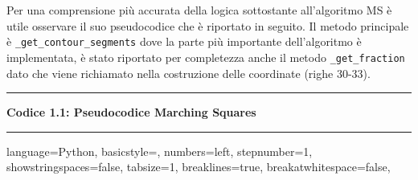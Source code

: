 \documentclass[12pt,a4paper]{report}
\begin{document}
Per una comprensione più accurata della logica sottostante all'algoritmo MS è utile osservare il suo pseudocodice che è riportato in seguito. \newline
Il metodo principale è \verb|_get_contour_segments| dove la parte più importante dell'algoritmo è implementata, è stato riportato per completezza anche il metodo \verb|_get_fraction| dato che viene richiamato nella costruzione delle coordinate (righe 30-33). 
\\[10pt]
\noindent\rule[0.5ex]{\linewidth}{2pt}
\small{\textbf{Codice 1.1: Pseudocodice Marching Squares}} \\
\noindent\rule[0.5ex]{\linewidth}{1pt}
\lstset
{ %
    language=Python,
    basicstyle=\footnotesize,
    numbers=left,
    stepnumber=1,
    showstringspaces=false,
    tabsize=1,
    breaklines=true,
    breakatwhitespace=false,
}
\end{document}
